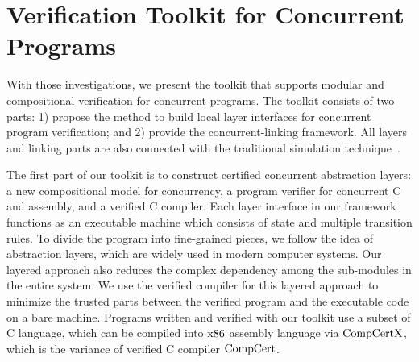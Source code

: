 \section{Verification Toolkit for Concurrent Programs}
\label{chapter:introduction:sec:verification-toolkit-for-concurrent-programs}
%
With those investigations, we present the toolkit that supports modular and compositional verification for concurrent programs. 
The toolkit consists of two parts: 1) propose the method to build local layer interfaces for concurrent program verification; and 
2) provide the concurrent-linking framework. All layers and linking parts are also connected with the traditional simulation 
technique~\cite{compcert, deepspec}. 
 
The first part of our toolkit is to construct certified concurrent abstraction layers: a new compositional model for concurrency, 
a program verifier for concurrent C and assembly, and a verified C compiler. 
Each layer interface in our framework functions as an executable machine which consists of state and multiple transition rules. 
To divide the program into fine-grained pieces, we follow the idea of abstraction layers, which are widely used in modern computer systems. 
Our layered approach also reduces the complex dependency among the sub-modules in the entire system.
We use the verified compiler for this layered approach to minimize the trusted parts between the verified program and the executable code 
on a bare machine. Programs written and verified with our toolkit use a subset of C language, 
which can be compiled into $\mathrm{x86}$ assembly language via $\mathrm{CompCertX}$, which is the variance of verified C compiler $\mathrm{CompCert}$.

